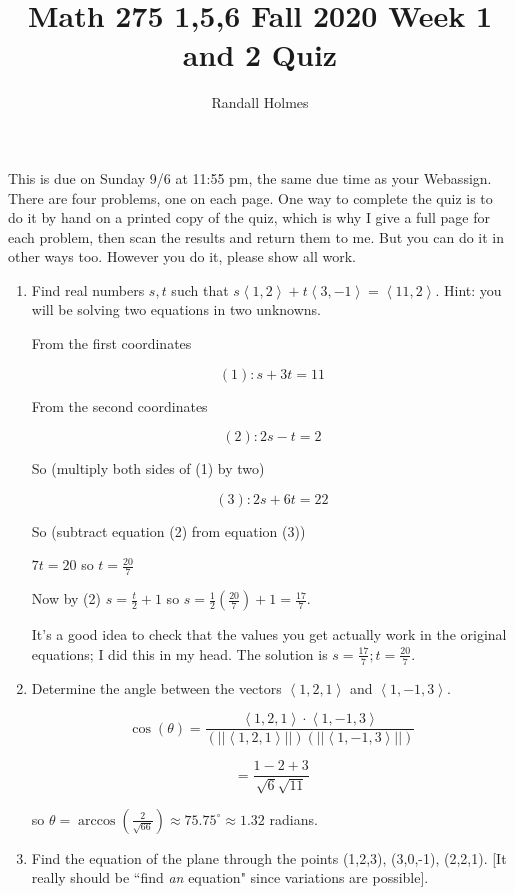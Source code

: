 \documentclass[12pt]{article}
\title {Math 275 1,5,6 Fall 2020 Week 1 and 2 Quiz}
\author{Randall Holmes}
\begin{document}
\maketitle

This is due on Sunday 9/6 at 11:55 pm, the same due time as your Webassign.   There are four problems, one on each page.  One way to complete the quiz is to do it by hand on a printed copy of  the quiz, which is why I give a full page for each problem, then scan the results and return them to me.  But you can do it in other ways too.  However you do it, please show all work.
\begin{enumerate}

\item  Find real numbers $s,t$ such that $s\left<1,2\right> + t\left<3,-1\right>= \left<11,2\right>$.  Hint:  you will be solving two equations in two unknowns.

From the first coordinates

$$(1): s+3t = 11$$

From the second coordinates

$$(2): 2s-t=2$$

So (multiply both sides of (1) by two)

$$(3): 2s+6t = 22$$

So (subtract equation (2) from equation (3))

$7t = 20$ so $t = \frac{20}7$

Now by (2) $s = \frac t2 +1$ so $s=\frac 12(\frac{20}7) + 1=\frac{17}7$.

It's a good idea to check that the values you get actually work in the original equations;  I did this in my head.  The solution is $s=\frac{17}7;  t = \frac{20}7$.

\newpage

\item  Determine the angle between the vectors $\left<1,2,1\right>$ and $\left<1,-1,3\right>$.

$$\cos(\theta) = \frac{\left<1,2,1\right>\cdot\left<1,-1,3\right>}{(||\left<1,2,1\right>||)(||\left<1,-1,3\right>||)}$$

$$ = \frac{1-2+3}{\sqrt{6}\sqrt{11}}$$

so $\theta = \arccos(\frac 2{\sqrt{66}}) \approx 75.75^{\circ} \approx 1.32$ radians.

\newpage

\item  Find the equation of the plane through the points (1,2,3),  (3,0,-1), (2,2,1).  [It really should be ``find {\em an} equation" since variations are possible].


\end{enumerate}
\end{document}
